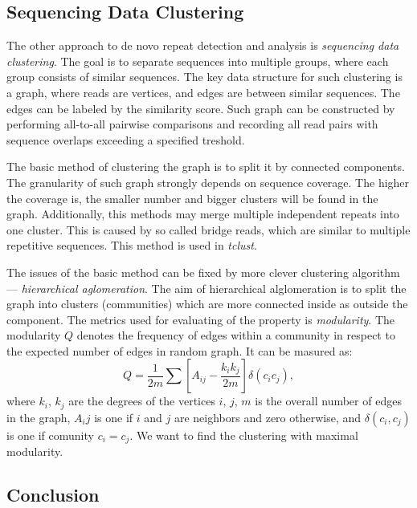 \subsection{Sequencing Data Clustering}

The other approach to de novo repeat detection and analysis is \emph{sequencing data clustering}. The goal is to separate sequences into multiple groups, where each group consists of similar sequences.
The key data structure for such clustering is a graph, where reads are vertices, and edges are between similar sequences. The edges can be labeled by the similarity score. Such graph can be constructed by performing all-to-all pairwise comparisons and recording all read pairs with sequence overlaps exceeding a specified treshold\cite{pertea2003tigr, novak2010graph}. 

The basic method of clustering the graph is to split it by connected components. The granularity of such graph strongly depends on sequence coverage. The higher the coverage is, the smaller number and bigger clusters will be found in the graph. Additionally, this methods may merge multiple independent repeats into one cluster. This is caused by so called bridge reads, which are similar to multiple repetitive sequences. This method is used in \emph{tclust}\cite{pertea2003tigr}.

The issues of the basic method can be fixed by more clever clustering algorithm --- \emph{hierarchical aglomeration}. The aim of hierarchical alglomeration is to split the graph into clusters (communities) which are more connected inside as outside the component. The metrics used for evaluating of the property is \emph{modularity}.
The modularity $Q$ denotes the frequency of edges within a community in respect to the expected number of edges in random graph. It can be masured as:
$$Q = \frac{1}{2m}\sum\left[A_{ij}-\frac{k_i k_j}{2m}\right] \delta(c_i c_j),$$
where $k_i,\, k_j$ are the degrees of the vertices $i,\,j$, $m$ is the overall number of edges in the graph, $A_ij$ is one if $i$ and $j$ are neighbors and zero otherwise, and $\delta(c_i, c_j)$ is one if comunity $c_i = c_j$.
We want to find the clustering with maximal modularity.



\subsection{Conclusion}

